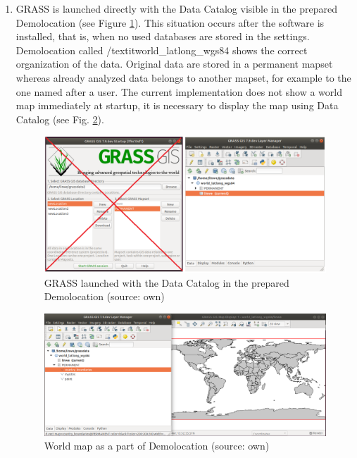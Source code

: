 \documentclass[a4paper,10pt,twoside]{article}
\begin{document}
\begin{enumerate}

\item GRASS is launched directly with the Data Catalog visible in the prepared Demolocation (see Figure \ref{fig:demolocation_startup}). This situation occurs after the software is installed, that is, when no used databases are stored in the settings. Demolocation called /textit{world\_latlong\_wgs84} shows the correct organization of the data. Original data are stored in a permanent mapset whereas already analyzed data belongs to another mapset, for example to the one named after a user. The current implementation does not show a world map immediately at startup, it is necessary to display the map using Data Catalog (see Fig. \ref{fig:demolocation}).

\vspace{0.3cm}
\begin{figure}[hbt!] 
\begin{center}
\includegraphics[width=15cm]{../pictures/demolocation_startup.png} 
\caption[GRASS launched with the Data Catalog in the prepared Demolocation]{GRASS launched with the Data Catalog in the prepared Demolocation (source: own)}
\label{fig:demolocation_startup}
\end{center}
\end{figure}

\vspace{0.3cm}
\begin{figure}[hbt!] 
\begin{center}
\includegraphics[width=15cm]{../pictures/demolocation.png} 
\caption[World map as a part of Demolocation]{World map as a part of Demolocation (source: own)}
\label{fig:demolocation}
\end{center}
\end{figure}


\end{enumerate}
\end{document}
